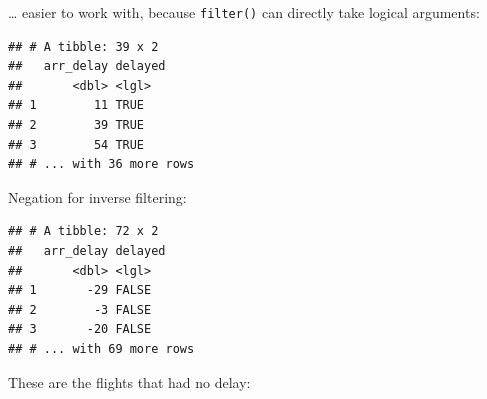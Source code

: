 \documentclass[]{book}
\newenvironment{Shaded}{}{}
\newcommand{\DataTypeTok}[1]{#1}
\newcommand{\DecValTok}[1]{#1}
\newcommand{\KeywordTok}[1]{\textcolor[rgb]{0.00,0.00,1.00}{#1}}
\newcommand{\NormalTok}[1]{#1}
\newcommand{\OperatorTok}[1]{#1}
\newcommand{\StringTok}[1]{\textcolor[rgb]{0.00,0.50,0.50}{#1}}
\begin{document}
\ldots{} easier to work with, because \texttt{filter()} can directly take logical arguments:

\begin{Shaded}
\end{Shaded}

\begin{verbatim}
## # A tibble: 39 x 2
##   arr_delay delayed
##       <dbl> <lgl>  
## 1        11 TRUE   
## 2        39 TRUE   
## 3        54 TRUE   
## # ... with 36 more rows
\end{verbatim}

Negation for inverse filtering:

\begin{Shaded}
\end{Shaded}

\begin{verbatim}
## # A tibble: 72 x 2
##   arr_delay delayed
##       <dbl> <lgl>  
## 1       -29 FALSE  
## 2        -3 FALSE  
## 3       -20 FALSE  
## # ... with 69 more rows
\end{verbatim}

These are the flights that had no delay:

\begin{Shaded}
\end{Shaded}
\end{document}
